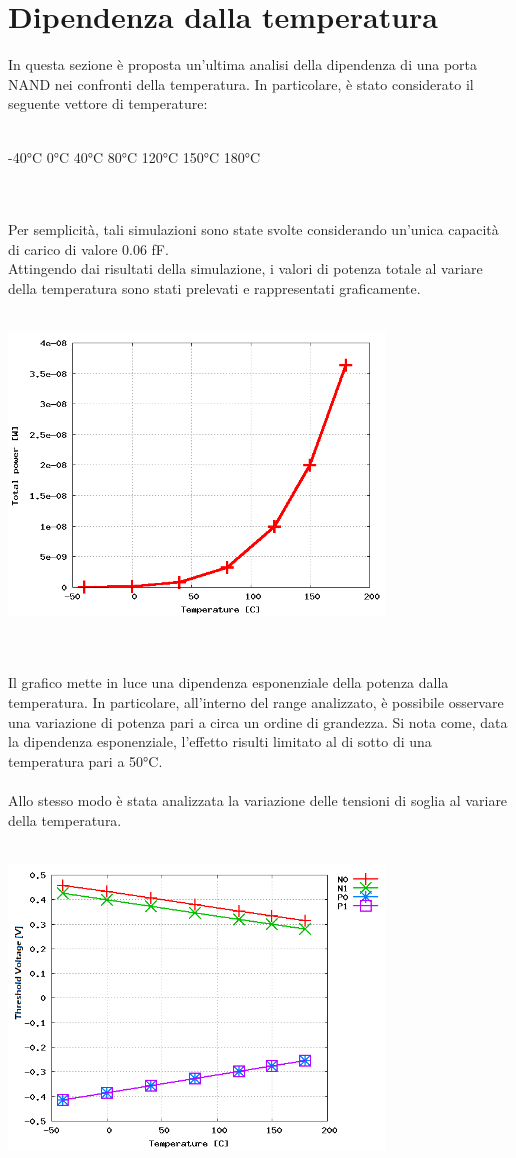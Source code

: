 \documentclass[11pt,  english, makeidx, a4paper, titlepage, oneside]{book}
\begin{document}
\section{Dipendenza dalla temperatura}
In questa sezione è proposta un'ultima analisi della dipendenza di una porta NAND nei confronti della temperatura. In particolare, è stato considerato il seguente vettore di temperature:
\\\\
\centerline{-40°C  0°C   40°C   80°C   120°C   150°C   180°C}
\\\\
Per semplicità, tali simulazioni sono state svolte considerando un'unica capacità di carico di valore 0.06 fF.
\\
Attingendo dai risultati della simulazione, i valori di potenza totale al variare della temperatura sono stati prelevati e rappresentati graficamente.
\\\\
\centerline{\includegraphics[width=10cm]{./img/Lab_5/power_temp.png}}
\\\\
Il grafico mette in luce una dipendenza esponenziale della potenza dalla temperatura. In particolare, all'interno del range analizzato, è possibile osservare una variazione di potenza pari a circa un ordine di grandezza. Si nota come, data la dipendenza esponenziale, l'effetto risulti limitato al di sotto di una temperatura pari a 50°C.
\\\\
Allo stesso modo è stata analizzata la variazione delle tensioni di soglia al variare della temperatura. 
\\\\
\centerline{\includegraphics[width=10cm]{./img/Lab_5/vt_temp1.png}}
\end{document}
